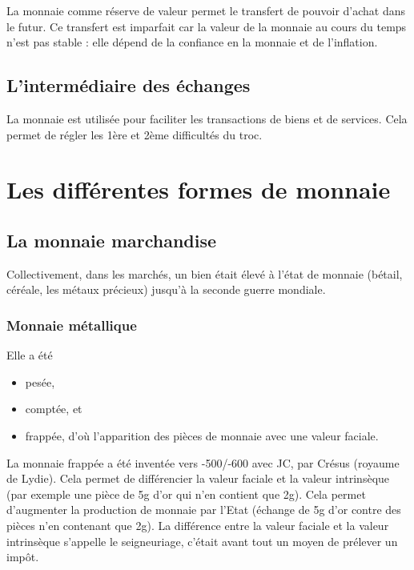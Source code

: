 	La monnaie comme réserve de valeur permet le transfert de pouvoir d'achat dans le futur. Ce transfert est imparfait car la valeur de la monnaie au cours du temps n'est pas stable : elle dépend de la confiance en la monnaie et de l'inflation.
	
	\subsection{L'intermédiaire des échanges}
	
	La monnaie est utilisée pour faciliter les transactions de biens et de services. Cela permet de régler les 1ère et 2ème difficultés du troc.
	
\section{Les différentes formes de monnaie}

	\subsection{La monnaie marchandise}
	
	Collectivement, dans les marchés, un bien était élevé à l'état de monnaie (bétail, céréale, les métaux précieux) jusqu'à la seconde guerre mondiale.
	
		\subsubsection{Monnaie métallique}
		
		Elle a été
		
		\begin{itemize}
			\item pesée,
			\item comptée, et
			\item frappée, d'où l'apparition des pièces de monnaie avec une valeur faciale.
		\end{itemize}
		
		La monnaie frappée a été inventée vers -500/-600 avec JC, par Crésus (royaume de Lydie). Cela permet de différencier la valeur faciale et la valeur intrinsèque (par exemple une pièce de 5g d'or qui n'en contient que 2g). Cela permet d'augmenter la production de monnaie par l'Etat (échange de 5g d'or contre des pièces n'en contenant que 2g). La différence entre la valeur faciale et la valeur intrinsèque s'appelle le seigneuriage, c'était avant tout un moyen de prélever un impôt.
		
